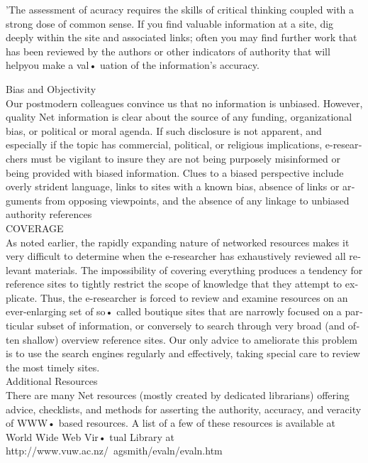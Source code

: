 \documentclass[a4 paper,12pt]{article}\usepackage{xepersian}
\begin{document}
\begin{latin}
'The assessment of acuracy requires the skills of critical thinking coupled  with a strong dose of common sense.  If you find  valuable information at a site, dig deeply within  the site and associated  links;  often you may  find further work  that has been
reviewed by  the authors or other indicators of authority that will helpyou make a val•
uation of the information's accuracy. 

Bias and Objectivity\\
\noindent
Our postmodern colleagues convince us that no information is unbiased. However, quality  Net information  is clear about the source of any  funding, organizational  bias, or political or moral agenda. If such disclosure is not apparent, and especially  if the topic has commercial, political, or religious implications, e-researchers must be vigilant to insure they are not being purposely  misinformed or being provided  with  biased information. Clues to a biased perspective  include overly  strident  language, links to sites with a known bias, absence of links or arguments from  opposing viewpoints, and the absence of any linkage to unbiased authority references\\
COVERAGE\\
\vspace{0.1cm}
As  noted earlier, the rapidly  expanding nature of networked resources makes it very
difficult to determine  when  the e-researcher  has exhaustively  reviewed  all  relevant
\noindent
materials. The impossibility  of covering everything produces  a tendency  for reference sites to tightly restrict the scope of knowledge that they attempt  to explicate. Thus, the e-researcher is forced to review and examine resources on an ever-enlarging set of so• called boutique  sites that are narrowly focused on a particular subset of information, or conversely to search through  very broad (and often shallow) overview reference sites. Our  only advice to ameliorate this problem  is to  use the search engines regularly and effectively, taking special  care to review the most timely sites.\\
\noindent
Additional  Resources\\
\noindent
There are many Net resources (mostly created by dedicated librarians) offering advice, checklists,  and methods  for asserting the authority, accuracy, and veracity of WWW• based resources. A list of a few of these resources is available at World  Wide Web Vir• tual Library at http://www.vuw.ac.nz/~agsmith/evaln/evaln.htm\\
\vspace{0.1cm}

\end{latin}
\end{document}
